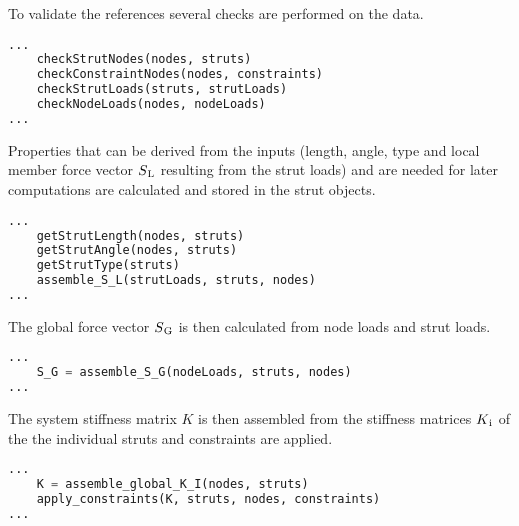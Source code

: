 \pagebreak

To validate the references several checks are performed on the data.

\begin{inconsolata}
\begin{minipage}{\linewidth}
\begin{lstlisting}[language=python]
...
    checkStrutNodes(nodes, struts)
    checkConstraintNodes(nodes, constraints)
    checkStrutLoads(struts, strutLoads)
    checkNodeLoads(nodes, nodeLoads)
...
\end{lstlisting}
\end{minipage}
\end{inconsolata}

Properties that can be derived from the inputs (length, angle, type and local member force vector $S\textsubscript{L}$ resulting from the strut loads) and are needed for later computations are calculated and stored in the strut objects.

\begin{inconsolata}
\begin{minipage}{\linewidth}
\begin{lstlisting}[language=python]
...
    getStrutLength(nodes, struts)
    getStrutAngle(nodes, struts)
    getStrutType(struts)
    assemble_S_L(strutLoads, struts, nodes)
...
\end{lstlisting}
\end{minipage}
\end{inconsolata}

The global force vector $S\textsubscript{G}$ is then calculated from node loads and strut loads.

\begin{inconsolata}
\begin{minipage}{\linewidth}
\begin{lstlisting}[language=python]
...
    S_G = assemble_S_G(nodeLoads, struts, nodes)
...
\end{lstlisting}
\end{minipage}
\end{inconsolata}

The system stiffness matrix $K$ is then assembled from the stiffness matrices $K\textsubscript{i}$ of the the individual struts and constraints are applied.

\begin{inconsolata}
\begin{minipage}{\linewidth}
\begin{lstlisting}[language=python]
...
    K = assemble_global_K_I(nodes, struts)
    apply_constraints(K, struts, nodes, constraints)
...
\end{lstlisting}
\end{minipage}
\end{inconsolata}

